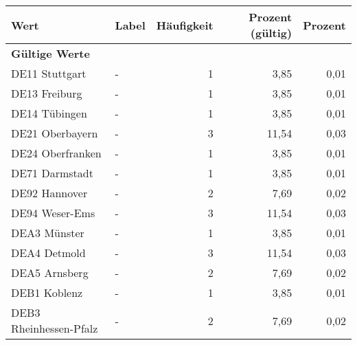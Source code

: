      \begin{longtable}{Xlrrr}
     \toprule
     \textbf{Wert} & \textbf{Label} & \textbf{Häufigkeit} & \textbf{Prozent (gültig)} & \textbf{Prozent} \\
     \endhead
     \midrule
     \multicolumn{5}{l}{\textbf{Gültige Werte}}\\

     \multicolumn{1}{X}{DE11 Stuttgart} &
     - &
     1 &
     3,85 &
     0,01 \\

     \multicolumn{1}{X}{DE13 Freiburg} &
     - &
     1 &
     3,85 &
     0,01 \\

     \multicolumn{1}{X}{DE14 Tübingen} &
     - &
     1 &
     3,85 &
     0,01 \\

     \multicolumn{1}{X}{DE21 Oberbayern} &
     - &
     3 &
     11,54 &
     0,03 \\

     \multicolumn{1}{X}{DE24 Oberfranken} &
     - &
     1 &
     3,85 &
     0,01 \\

     \multicolumn{1}{X}{DE71 Darmstadt} &
     - &
     1 &
     3,85 &
     0,01 \\

     \multicolumn{1}{X}{DE92 Hannover} &
     - &
     2 &
     7,69 &
     0,02 \\

     \multicolumn{1}{X}{DE94 Weser-Ems} &
     - &
     3 &
     11,54 &
     0,03 \\

     \multicolumn{1}{X}{DEA3 Münster} &
     - &
     1 &
     3,85 &
     0,01 \\

     \multicolumn{1}{X}{DEA4 Detmold} &
     - &
     3 &
     11,54 &
     0,03 \\

     \multicolumn{1}{X}{DEA5 Arnsberg} &
     - &
     2 &
     7,69 &
     0,02 \\

     \multicolumn{1}{X}{DEB1 Koblenz} &
     - &
     1 &
     3,85 &
     0,01 \\

     \multicolumn{1}{X}{DEB3 Rheinhessen-Pfalz} &
     - &
     2 &
     7,69 &
     0,02 \\


\end{longtable}
